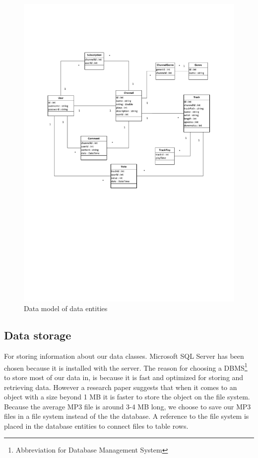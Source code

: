 \documentclass[a4paper,11pt,report]{article}
\begin{document}
\begin{figure}[H]
  \centering
\includegraphics[width=420pt,keepaspectratio=true,trim=60pt 300pt 60pt 80pt]{./ermodel.pdf}
\caption{Data model of data entities}
\end{figure}
\subsection{Data storage}
For storing information about our data classes. Microsoft SQL Server has been chosen because it is installed with the server. The reason for choosing a DBMS\footnote[1]{Abbreviation for Database Management System} to store most of our data in, is because it is fast and optimized for storing and retrieving data. However a research paper\cite{Russel} suggests that when it comes to an object with a size beyond 1 MB it is faster to store the object on the file system. Because the average MP3 file is around 3-4 MB long, we choose to save our MP3 files in a file system instead of the the database. A reference to the file system is placed in the database entities to connect files to table rows.
\newpage
\end{document}
